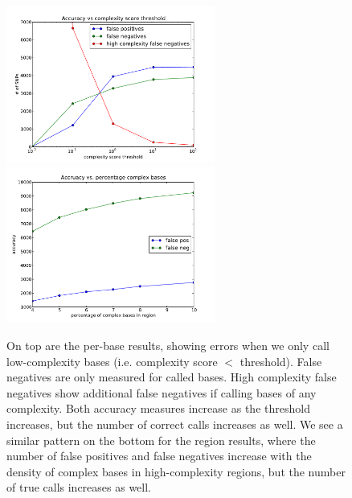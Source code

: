 \documentclass[10pt]{article}
\begin{document}
\begin{figure}[h!]
	\includegraphics[width=2.7in]{figs/base_accuracy_vs_thresh.pdf}
	\includegraphics[width=2.7in]{figs/region_accuracy_vs_thresh.pdf}
	\caption{On top are the per-base results, showing errors when we only call low-complexity bases (i.e. complexity score $<$ threshold).
  False negatives are only measured for called bases.
  High complexity false negatives show additional false negatives if calling bases of any complexity.
  Both accuracy measures increase as the threshold increases, but the number of correct calls increases as well.
  We see a similar pattern on the bottom for the region results, where the number of false positives and false negatives increase with the density of complex bases in high-complexity regions, but the number of true calls increases as well.}
	\end{figure}
\end{document}
